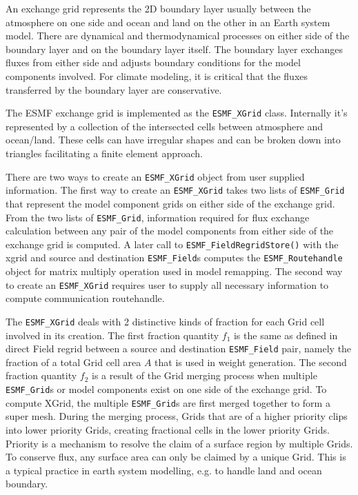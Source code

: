 
\label{sec:xgrid:desc}
An exchange grid represents the 2D boundary layer usually between the
atmosphere on one side and ocean and land on the other in an Earth
system model. There are dynamical and thermodynamical processes on
either side of the boundary layer and on the boundary layer itself.
The boundary layer exchanges fluxes from either side and adjusts
boundary conditions for the model components involved. For climate modeling,
it is critical that the fluxes transferred by the boundary layer are
conservative.

The ESMF exchange grid is implemented as the {\tt ESMF\_XGrid} class. 
Internally it's represented by a collection of the intersected cells
between atmosphere and ocean/land\cite{BalajiXGrid}. These cells can have irregular shapes
and can be broken down into triangles facilitating a finite element
approach. 

There are two ways to create an {\tt ESMF\_XGrid} object from
user supplied information. The first way to create an {\tt ESMF\_XGrid} takes
two lists of {\tt ESMF\_Grid} that represent the model component grids on
either side of the exchange grid. From the two lists of {\tt ESMF\_Grid},
information required for flux exchange calculation between any pair of the 
model components from either side of the exchange grid is computed. A later
call to {\tt ESMF\_FieldRegridStore()} with the xgrid and source and destination
{\tt ESMF\_Field}s computes the {\tt ESMF\_Routehandle} object for matrix
multiply operation used in model remapping. The second way to create an {\tt ESMF\_XGrid}
requires user to supply all necessary information to compute communication routehandle.

The {\tt ESMF\_XGrid} deals with 2 distinctive kinds of fraction for each Grid cell
involved in its creation. The first fraction quantity $f_1$ is the same as defined in direct
Field regrid between a source and destination {\tt ESMF\_Field} pair, namely the fraction
of a total Grid cell area $A$ that is used in weight generation. The second fraction quantity $f_2$
is a result of the Grid merging process when multiple {\tt ESMF\_Grid}s or model components
exist on one side of the exchange grid. To compute XGrid, the multiple {\tt ESMF\_Grid}s
are first merged together to form a super mesh. During the merging process, Grids that are
of a higher priority clips into lower priority Grids, creating fractional cells in the lower
priority Grids. Priority is a mechanism to resolve the claim of a surface region by multiple
Grids. To conserve flux, any surface area can only be claimed by a unique Grid. This is
a typical practice in earth system modelling, e.g. to handle land and ocean boundary.


